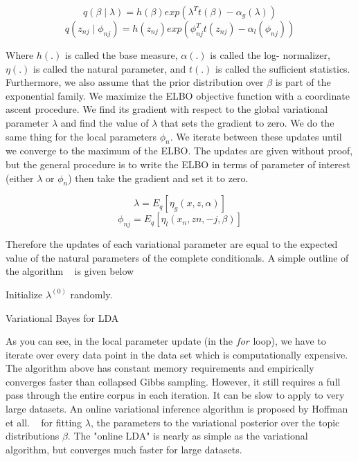 \documentclass[12pt]{report}
\begin{document}
\begin{equation}
q(\beta \mid \lambda) = h(\beta) exp(\lambda^T t(\beta) - \alpha_g(\lambda))
\end{equation}
\begin{equation}
q(z_{nj} \mid \phi_{nj}) = h(z_{nj}) exp(\phi_{nj}^T t(z_{nj}) - \alpha_l(\phi_{nj}))
\end{equation}

Where $h(.)$ is called the base measure, $\alpha(.)$ is called the log-
normalizer, $\eta(.)$ is called the natural parameter, and $t(.)$ is called the
sufficient statistics. Furthermore, we also assume that the prior distribution
over $\beta$ is part of the exponential family. We maximize the ELBO objective
function with a coordinate ascent procedure. We find its gradient with respect
to the global variational parameter $\lambda$ and find the value of $\lambda$
that sets the gradient to zero. We do the same thing for the local parameters
$\phi_n$. We iterate between these updates until we converge to the maximum of
the ELBO. The updates are given without proof, but the general procedure is to
write the ELBO in terms of parameter of interest (either $\lambda$ or $\phi_n$)
then take the gradient and set it to zero.

\begin{equation}
\lambda = E_q[\eta_g(x, z, \alpha)]
\end{equation}
\begin{equation}
\phi_{nj} = E_q[\eta_l(x_n, z{n, -j}, \beta)]
\end{equation}

Therefore the updates of each variational parameter are equal to the expected
value of the natural parameters of the complete conditionals. A simple outline 
of the algorithm ~\cite{alexminnar} is given below


\begin{algorithm}[H] 
\SetAlgoLined

Initialize $\lambda^{(0)}$ randomly.
\caption{Variational Bayes for LDA} 
\end{algorithm}


As you can see, in the local parameter update (in the $for$ loop), we have to
iterate over every data point in the data set which is computationally
expensive. The algorithm above has constant memory requirements and empirically
converges faster than collapsed Gibbs sampling. However, it still requires a
full pass through the entire corpus in each iteration. It can be slow to apply
to very large datasets. An online variational inference algorithm is proposed by
Hoffman et all. ~\cite{onlineLDAvb} for fitting $\lambda$, the parameters to the
variational posterior over the topic distributions $\beta$. The "online LDA" is
nearly as simple as the variational algorithm, but converges much faster for
large datasets.
\end{document}
